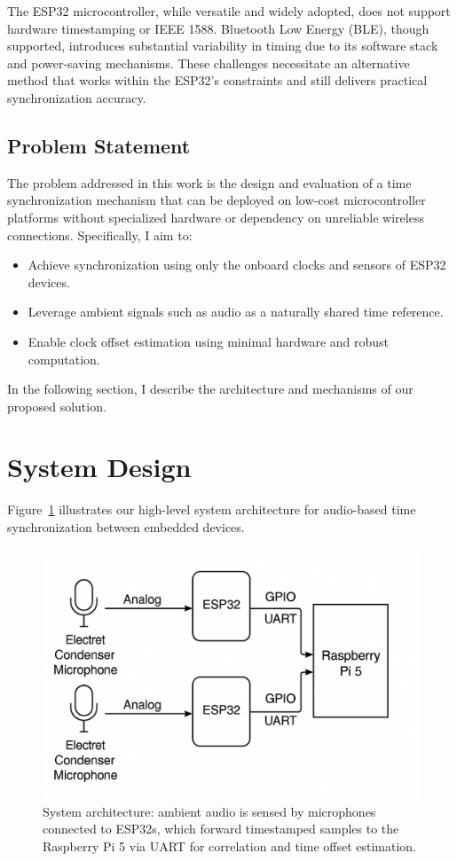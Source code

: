\documentclass[sigconf]{acmart}
\begin{document}
The ESP32 microcontroller, while versatile and widely adopted, does not support hardware timestamping or IEEE 1588. Bluetooth Low Energy (BLE), though supported, introduces substantial variability in timing due to its software stack and power-saving mechanisms. These challenges necessitate an alternative method that works within the ESP32’s constraints and still delivers practical synchronization accuracy.

\subsection{Problem Statement}
The problem addressed in this work is the design and evaluation of a time synchronization mechanism that can be deployed on low-cost microcontroller platforms without specialized hardware or dependency on unreliable wireless connections. Specifically, I aim to:
\begin{itemize}
    \item Achieve synchronization using only the onboard clocks and sensors of ESP32 devices.
    \item Leverage ambient signals such as audio as a naturally shared time reference.
    \item Enable clock offset estimation using minimal hardware and robust computation.
\end{itemize}

\noindent In the following section, I describe the architecture and mechanisms of our proposed solution.

\section{System Design}
Figure~\ref{fig:system-diagram} illustrates our high-level system architecture for audio-based time synchronization between embedded devices.

\begin{figure}[H]
    \centering
    \includegraphics[width=\linewidth]{system_diagram.png}
    \caption{System architecture: ambient audio is sensed by microphones connected to ESP32s, which forward timestamped samples to the Raspberry Pi 5 via UART for correlation and time offset estimation.}
    \label{fig:system-diagram}
\end{figure}
\end{document}
